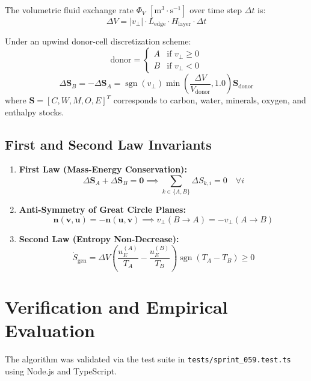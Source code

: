 \documentclass[10pt,journal,compsoc]{IEEEtran}
\begin{document}
The volumetric fluid exchange rate $\Phi_V$ $[\text{m}^3\cdot\text{s}^{-1}]$ over time step $\Delta t$ is:
\begin{equation}
\Delta V = |v_{\perp}| \cdot L_{\text{edge}} \cdot H_{\text{layer}} \cdot \Delta t
\end{equation}

Under an upwind donor-cell discretization scheme:
\begin{equation}
\text{donor} = \begin{cases} A & \text{if } v_{\perp} \ge 0 \\ B & \text{if } v_{\perp} < 0 \end{cases}
\end{equation}
\begin{equation}
\Delta \mathbf{S}_B = -\Delta \mathbf{S}_A = \operatorname{sgn}(v_{\perp}) \min\left( \frac{\Delta V}{V_{\text{donor}}}, 1.0 \right) \mathbf{S}_{\text{donor}}
\end{equation}
where $\mathbf{S} = [C, W, M, O, E]^T$ corresponds to carbon, water, minerals, oxygen, and enthalpy stocks.

\subsection{First and Second Law Invariants}
\begin{enumerate}
    \item \textbf{First Law (Mass-Energy Conservation):}
    \begin{equation}
    \Delta \mathbf{S}_A + \Delta \mathbf{S}_B = \mathbf{0} \implies \sum_{k \in \{A, B\}} \Delta S_{k, i} = 0 \quad \forall i
    \end{equation}
    \item \textbf{Anti-Symmetry of Great Circle Planes:}
    \begin{equation}
    \mathbf{n}(\mathbf{v}, \mathbf{u}) = -\mathbf{n}(\mathbf{u}, \mathbf{v}) \implies v_{\perp}(B \to A) = -v_{\perp}(A \to B)
    \end{equation}
    \item \textbf{Second Law (Entropy Non-Decrease):}
    \begin{equation}
    \dot{S}_{\text{gen}} = \Delta V \left( \frac{u_E^{(A)}}{T_A} - \frac{u_E^{(B)}}{T_B} \right) \operatorname{sgn}(T_A - T_B) \ge 0
    \end{equation}
\end{enumerate}

\section{Verification and Empirical Evaluation}
The algorithm was validated via the test suite in \texttt{tests/sprint\_059.test.ts} using Node.js and TypeScript.
\end{document}
